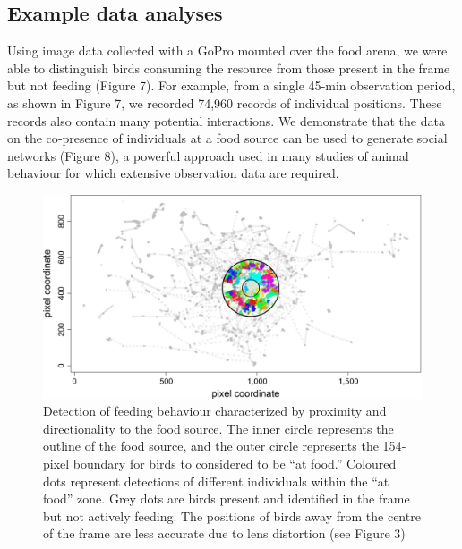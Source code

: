 \documentclass[11pt,a4paper,oneside]{book}
\begin{document}
\subsection{Example data analyses}
Using image data collected with a GoPro mounted over the food arena, we were able to distinguish birds consuming the resource from those present in the frame but not feeding (Figure 7). For example, from a single 45‐min observation period, as shown in Figure 7, we recorded 74,960 records of individual positions. These records also contain many potential interactions. We demonstrate that the data on the co‐presence of individuals at a food source can be used to generate social networks (Figure 8), a powerful approach used in many studies of animal behaviour for which extensive observation data are required.

\begin{figure}[!htb]
    \centering
    \includegraphics{Graving_IMPRS_Thesis/figures/bird_figure_7.jpg}
    \caption{Detection of feeding behaviour characterized by proximity and directionality to the food source. The inner circle represents the outline of the food source, and the outer circle represents the 154‐pixel boundary for birds to considered to be “at food.” Coloured dots represent detections of different individuals within the “at food” zone. Grey dots are birds present and identified in the frame but not actively feeding. The positions of birds away from the centre of the frame are less accurate due to lens distortion (see Figure 3)
}
    \label{fig:bird_figure_7}
\end{figure}
\end{document}
